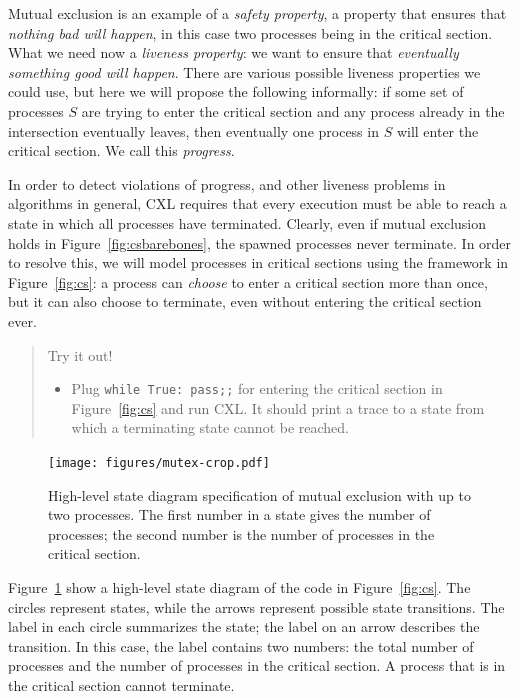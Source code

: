 \documentclass{report}
\begin{document}
Mutual exclusion is an example of a \emph{safety property}, a
property that ensures that \emph{nothing bad will happen}, in this case
two processes being in the critical section.
What we need now a \emph{liveness property}: we want to ensure that
\emph{eventually something good will happen}.
There are various possible liveness properties we could use,
but here we will propose the following informally: if some set of processes
$S$ are trying to enter the critical section and any process already in the
intersection eventually leaves, then eventually one process in $S$ will enter
the critical section.
We call this \emph{progress}.

In order to detect violations of progress, and other liveness problems in
algorithms in general, CXL requires that every execution must be
able to reach a state in which all processes have terminated.
Clearly, even if mutual exclusion holds in Figure~\ref{fig:csbarebones},
the spawned processes never terminate.  In order to resolve this, we
will model processes in critical sections using the framework in
Figure~\ref{fig:cs}: a process can \emph{choose} to enter a
critical section more than once, but it can also choose to terminate, even
without entering the critical section ever.

\begin{quote}
Try it out!
\begin{itemize}
\item Plug \texttt{while True: pass;;} for entering the critical section
in Figure~\ref{fig:cs} and run CXL.  It should print a trace
to a state from which a terminating state cannot be reached.
\end{itemize}
\end{quote}

\begin{figure}
\begin{center}
\texttt{[image: figures/mutex-crop.pdf]}
\end{center}
\caption{High-level state diagram specification of mutual exclusion with up to two processes.
The first number in a state gives the number of processes; the second number is the
number of processes in the critical section.}
\label{fig:mutex}
\end{figure}

Figure~\ref{fig:mutex} show a high-level state diagram of the code in
Figure~\ref{fig:cs}.
The circles represent states, while the arrows represent possible state
transitions.  The label in each circle summarizes the state;  the label
on an arrow describes the transition.  In this case,
the label contains two numbers: the total number of processes and the number
of processes in the critical section.  A process that is in the critical
section cannot terminate.
\end{document}
